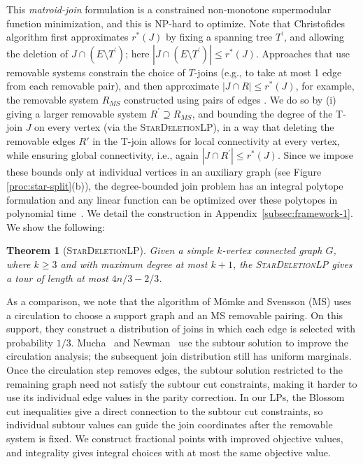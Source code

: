 \documentclass[11pt]{amsart}
\newcommand{\1}{\mathbbm{1}}
\newcommand{\LPone}{\textsc{StarDeletionLP}}
\newtheorem{theorem}{Theorem}[section]
\begin{document}
This {\it matroid-join} formulation is a constrained non-monotone supermodular function minimization, and this is NP-hard to optimize. {Note that Christofides algorithm \cite{Chr76} first approximates $r^*(J)$ by fixing a spanning tree $T^\prime$, and allowing the deletion of $J \cap (E\setminus T^\prime)$; here $|J \cap (E \setminus T^\prime)| \leq r^*(J)$. Approaches that use removable systems constrain the choice of $T$-joins (e.g., to take at most 1 edge from each removable pair), and then approximate $|J \cap R| \leq r^*(J)$, for example, the removable system $R_{MS}$ constructed using pairs of edges \cite{MomkeSvensson}. We do so by (i) giving a larger removable system $R^\prime \supseteq R_{MS}$, and bounding the degree of the T-join $J$ on every vertex (via the \LPone), in a way that deleting the removable edges $R'$ in the T-join allows for local connectivity at every vertex, while ensuring global connectivity, i.e., again $|J \cap R^\prime| \leq r^*(J)$. Since we impose these bounds only at individual vertices in an auxiliary graph (see Figure \ref{proc:star-split}(b)), the
degree-bounded join problem has an integral polytope formulation and any linear function can be optimized over these polytopes in polynomial
time~\cite[pp.564-568]{Schrijver2003}. We detail the construction in Appendix~\ref{subsec:framework-1}. We show the following:} 


\begin{theorem}[\LPone]
Given a simple $k$-vertex connected graph $G$, where $k\ge 3$
and with maximum degree at most $k+1$, the \LPone{} gives a tour of length at most $4n/3-2/3$.
\end{theorem}


As a comparison, we note that the algorithm of M\"omke and Svensson {(MS)}
\cite[Sections~3--4]{MomkeSvensson} uses a circulation to
choose a support graph and an MS removable pairing. On this
support, they construct a distribution of joins in which
each edge is selected with probability $1/3$. Mucha~\cite{Mucha} and Newman~\cite{Newman} use the subtour solution to improve the
circulation analysis; the subsequent join
distribution still has uniform marginals. Once the circulation
step removes edges, the subtour solution restricted to the
remaining graph need not satisfy the subtour cut constraints,
making it harder to use its individual edge values in the
parity correction. In our LPs, the Blossom cut inequalities give
a direct connection to the subtour cut constraints, so individual
subtour values can guide the join coordinates after the removable
system is fixed. We construct fractional points with improved
objective values, and integrality gives integral choices with
at most the same objective value.
\end{document}
